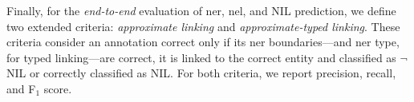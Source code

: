 

Finally, for the \textit{end-to-end} evaluation of \ac{ner}, \ac{nel}, and NIL prediction, we define two extended criteria: \textit{approximate linking} and \textit{approximate-typed linking}. These criteria consider an annotation correct only if its \ac{ner} boundaries---and \ac{ner} type, for typed linking---are correct, it is linked to the correct entity and classified as $\neg$NIL or correctly classified as NIL. For both criteria, we report precision, recall, and F$_1$ score.



